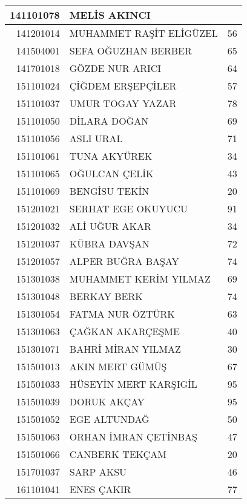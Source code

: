 \documentclass[12pt]{article}
\begin{document}
\begin{longtable}{||r||l||r||}
    141101078 & MELİS AKINCI &  \\
    \midrule
    141201014 & MUHAMMET RAŞİT ELİGÜZEL & 56 \\
    \midrule
    141504001 & SEFA OĞUZHAN BERBER & 65 \\
    \midrule
    141701018 & GÖZDE NUR ARICI & 64 \\
    \midrule
    151101024 & ÇİĞDEM ERŞEPÇİLER & 57 \\
    \midrule
    151101037 & UMUR TOGAY YAZAR & 78 \\
    \midrule
    151101050 & DİLARA DOĞAN & \cellcolor[rgb]{ 1,  1,  0} 69 \\
    \midrule
    151101056 & ASLI URAL & 71 \\
    \midrule
    151101061 & TUNA AKYÜREK & 34 \\
    \midrule
    151101065 & OĞULCAN ÇELİK & 43 \\
    \midrule
    151101069 & BENGİSU TEKİN & 20 \\
    \midrule
    151201021 & SERHAT EGE OKUYUCU & 91 \\
    \midrule
    151201032 & ALİ UĞUR AKAR & 34 \\
    \midrule
    151201037 & KÜBRA DAVŞAN & 72 \\
    \midrule
    151201057 & ALPER BUĞRA BAŞAY & 74 \\
    \midrule
    151301038 & MUHAMMET KERİM YILMAZ & 69 \\
    \midrule
    151301048 & BERKAY BERK & 74 \\
    \midrule
    151301054 & FATMA NUR ÖZTÜRK & 63 \\
    \midrule
    151301063 & ÇAĞKAN AKARÇEŞME & 40 \\
    \midrule
    151301071 & BAHRİ MİRAN YILMAZ & 30 \\
    \midrule
    151501013 & AKIN MERT GÜMÜŞ & 67 \\
    \midrule
    151501033 & HÜSEYİN MERT KARŞIGİL & 95 \\
    \midrule
    151501039 & DORUK AKÇAY & 95 \\
    \midrule
    151501052 & EGE ALTUNDAĞ & 50 \\
    \midrule
    151501063 & ORHAN İMRAN ÇETİNBAŞ & 47 \\
    \midrule
    151501066 & CANBERK TEKÇAM & 20 \\
    \midrule
    151701037 & SARP AKSU & 46 \\
    \midrule
    161101041 & ENES ÇAKIR & 77 \\

\end{longtable}
\end{document}
